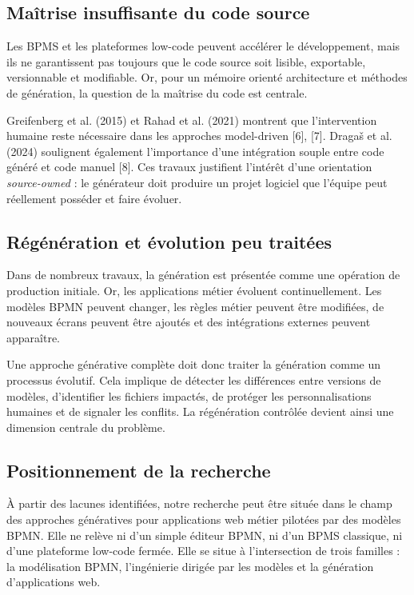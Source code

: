 \subsection{Maîtrise insuffisante du code source}

Les BPMS et les plateformes low-code peuvent accélérer le développement, mais ils ne garantissent pas toujours que le code source soit lisible, exportable, versionnable et modifiable. Or, pour un mémoire orienté architecture et méthodes de génération, la question de la maîtrise du code est centrale.

Greifenberg et al. (2015) et Rahad et al. (2021) montrent que l'intervention humaine reste nécessaire dans les approches model-driven [6], [7]. Dragaš et al. (2024) soulignent également l'importance d'une intégration souple entre code généré et code manuel [8]. Ces travaux justifient l'intérêt d'une orientation \textit{source-owned} : le générateur doit produire un projet logiciel que l'équipe peut réellement posséder et faire évoluer.

\subsection{Régénération et évolution peu traitées}

Dans de nombreux travaux, la génération est présentée comme une opération de production initiale. Or, les applications métier évoluent continuellement. Les modèles BPMN peuvent changer, les règles métier peuvent être modifiées, de nouveaux écrans peuvent être ajoutés et des intégrations externes peuvent apparaître.

Une approche générative complète doit donc traiter la génération comme un processus évolutif. Cela implique de détecter les différences entre versions de modèles, d'identifier les fichiers impactés, de protéger les personnalisations humaines et de signaler les conflits. La régénération contrôlée devient ainsi une dimension centrale du problème.

\subsection{Positionnement de la recherche}

À partir des lacunes identifiées, notre recherche peut être située dans le champ des approches génératives pour applications web métier pilotées par des modèles BPMN. Elle ne relève ni d'un simple éditeur BPMN, ni d'un BPMS classique, ni d'une plateforme low-code fermée. Elle se situe à l'intersection de trois familles : la modélisation BPMN, l'ingénierie dirigée par les modèles et la génération d'applications web.

